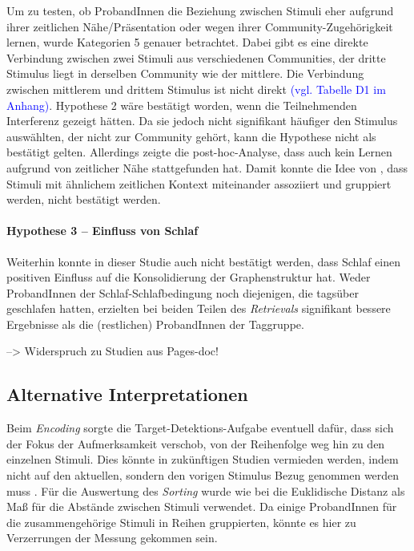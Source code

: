 Um zu testen, ob ProbandInnen die Beziehung zwischen Stimuli eher aufgrund ihrer zeitlichen Nähe/Präsentation oder wegen ihrer Community-Zugehörigkeit lernen, wurde Kategorien 5 genauer betrachtet. Dabei gibt es eine direkte Verbindung zwischen zwei Stimuli aus verschiedenen Communities, der dritte Stimulus liegt in derselben Community wie der mittlere. Die Verbindung zwischen mittlerem und drittem Stimulus ist nicht direkt \textcolor{blue}{(vgl. Tabelle D1 im Anhang)}. Hypothese 2 wäre bestätigt worden, wenn die Teilnehmenden Interferenz gezeigt hätten. Da sie jedoch nicht signifikant häufiger den Stimulus auswählten, der nicht zur Community gehört, kann die Hypothese nicht als bestätigt gelten. Allerdings zeigte die post-hoc-Analyse, dass auch kein Lernen aufgrund von zeitlicher Nähe stattgefunden hat. Damit konnte die Idee von \citet{Schapiro2013}, dass Stimuli mit ähnlichem zeitlichen Kontext miteinander assoziiert und gruppiert werden, nicht bestätigt werden.

\paragraph{Hypothese 3 – Einfluss von Schlaf}
Weiterhin konnte in dieser Studie auch nicht bestätigt werden, dass Schlaf einen positiven Einfluss auf die Konsolidierung der Graphenstruktur hat. Weder ProbandInnen der Schlaf-Schlafbedingung noch diejenigen, die tagsüber geschlafen hatten, erzielten bei beiden Teilen des \textit{Retrievals} signifikant bessere Ergebnisse als die (restlichen) ProbandInnen der Taggruppe.

--> Widerspruch zu Studien aus Pages-doc!



\subsection{Alternative Interpretationen}
Beim \textit{Encoding} sorgte die Target-Detektions-Aufgabe eventuell dafür, dass sich der Fokus der Aufmerksamkeit verschob, von der Reihenfolge weg hin zu den einzelnen Stimuli. Dies könnte in zukünftigen Studien vermieden werden, indem nicht auf den aktuellen, sondern den vorigen Stimulus Bezug genommen werden muss \citep[see][]{Garvert2017}.
Für die Auswertung des \textit{Sorting} wurde wie bei \citet{Garvert2017} die Euklidische Distanz als Maß für die Abstände zwischen Stimuli verwendet. Da einige ProbandInnen für die zusammengehörige Stimuli in Reihen gruppierten, könnte es hier zu Verzerrungen der Messung gekommen sein. 

